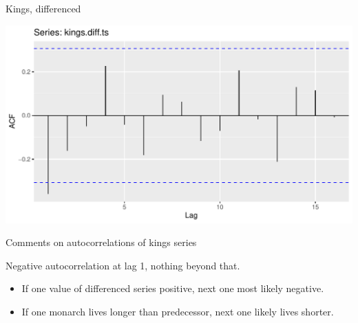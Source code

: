\documentclass[ignorenonframetext,]{beamer}
\newenvironment{Shaded}{\begin{snugshade}}{\end{snugshade}}
\newcommand{\DataTypeTok}[1]{\textcolor[rgb]{0.13,0.29,0.53}{#1}}
\newcommand{\KeywordTok}[1]{\textcolor[rgb]{0.13,0.29,0.53}{\textbf{#1}}}
\newcommand{\NormalTok}[1]{#1}
\newcommand{\OperatorTok}[1]{\textcolor[rgb]{0.81,0.36,0.00}{\textbf{#1}}}
\newcommand{\StringTok}[1]{\textcolor[rgb]{0.31,0.60,0.02}{#1}}
\providecommand{\tightlist}{%
  \setlength{\itemsep}{0pt}\setlength{\parskip}{0pt}}
\begin{document}
\begin{frame}[fragile]{Kings, differenced}
\protect\hypertarget{kings-differenced}{}

\begin{Shaded}
\end{Shaded}

\includegraphics{figure/unnamed-chunk-535-1.pdf}

\end{frame}

\begin{frame}{Comments on autocorrelations of kings series}
\protect\hypertarget{comments-on-autocorrelations-of-kings-series}{}

Negative autocorrelation at lag 1, nothing beyond that.

\begin{itemize}
\tightlist
\item
  If one value of differenced series positive, next one most likely
  negative.
\item
  If one monarch lives longer than predecessor, next one likely lives
  shorter.
\end{itemize}

\end{frame}
\end{document}
